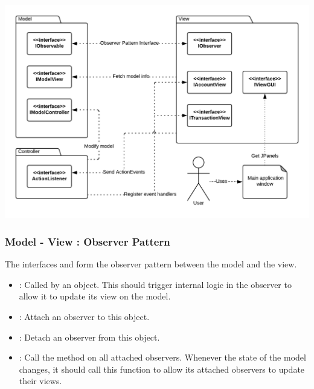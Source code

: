 \documentclass[12pt]{article}
\begin{document}
\includegraphics[width=\textwidth,height=\textheight,keepaspectratio]{diagrams/UML/Subsystem.png}
\bigskip

\subsubsection{Model - View : Observer Pattern}
The interfaces  and  form the observer pattern between the model and the view.\\

\begin{itemize}
	\item {} : Called by an  object. This should trigger internal logic in the observer to allow it to update its view on the model.
\end{itemize}\bigskip

\begin{itemize}
	\item {} : Attach an observer to this object.
	\item {} : Detach an observer from this object.
	\item {} : Call the  method on all attached observers. Whenever the state of the model changes, it should call this function to allow its attached observers to update their views.
\end{itemize}\bigskip
\end{document}
